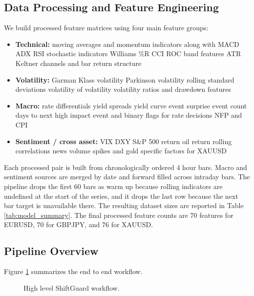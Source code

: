 \documentclass[11pt]{article}
\begin{document}
\subsection{Data Processing and Feature Engineering}
We build processed feature matrices using four main feature groups:
\begin{itemize}
    \item \textbf{Technical:} moving averages and momentum indicators along with MACD ADX RSI stochastic indicators Williams \%R CCI ROC band features ATR Keltner channels and bar return structure
    \item \textbf{Volatility:} Garman Klass volatility Parkinson volatility rolling standard deviations volatility of volatility volatility ratios and drawdown features
    \item \textbf{Macro:} rate differentials yield spreads yield curve event surprise event count days to next high impact event and binary flags for rate decisions NFP and CPI
    \item \textbf{Sentiment / cross asset:} VIX DXY S\&P 500 return oil return rolling correlations news volume spikes and gold specific factors for XAUUSD
\end{itemize}

Each processed pair is built from chronologically ordered 4 hour bars. Macro and sentiment sources are merged by date and forward filled across intraday bars. The pipeline drops the first 60 bars as warm up because rolling indicators are undefined at the start of the series, and it drops the last row because the next bar target is unavailable there. The resulting dataset sizes are reported in Table \ref{tab:model_summary}. The final processed feature counts are 70 features for EURUSD, 70 for GBPJPY, and 76 for XAUUSD.

\subsection{Pipeline Overview}
Figure \ref{fig:pipeline_overview} summarizes the end to end workflow.

\begin{figure}[H]
\centering
{}
\caption{High level ShiftGuard workflow.}
\label{fig:pipeline_overview}
\end{figure}
\end{document}
